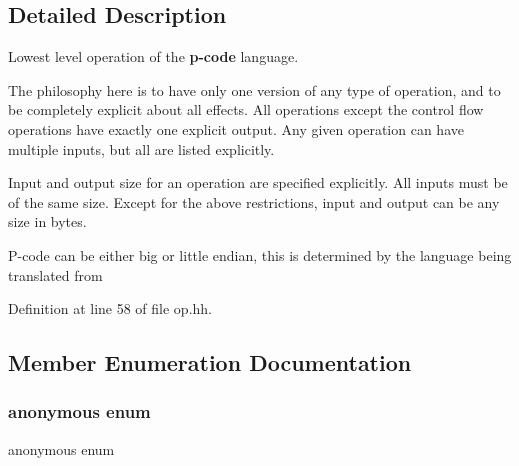 \subsection{Detailed Description}
Lowest level operation of the {\bfseries{p-\/code}} language. 

The philosophy here is to have only one version of any type of operation, and to be completely explicit about all effects. All operations except the control flow operations have exactly one explicit output. Any given operation can have multiple inputs, but all are listed explicitly.

Input and output size for an operation are specified explicitly. All inputs must be of the same size. Except for the above restrictions, input and output can be any size in bytes.

P-\/code can be either big or little endian, this is determined by the language being translated from 

Definition at line 58 of file op.\+hh.



\subsection{Member Enumeration Documentation}
\mbox{\label{class_pcode_op_ad8230d20e6cd3905b8ec0bb6652eb91f}} 
\subsubsection{\texorpdfstring{anonymous enum}{anonymous enum}}
{\footnotesize\ttfamily anonymous enum}

